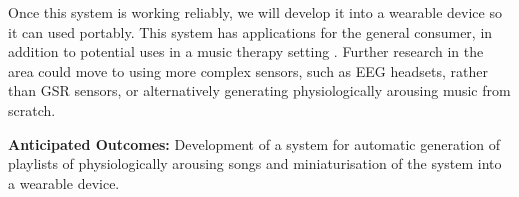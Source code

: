 \documentclass[a4paper,12pt]{article}
\begin{document}
	Once this system is working reliably, we will develop it into a wearable device so it can used portably. This system has applications for the general consumer, in addition to potential uses in a music therapy setting \citep{musicTherapy}. Further research in the area could move to using more complex sensors, such as EEG headsets, rather than GSR sensors, or alternatively generating physiologically arousing music from scratch.
	
	\textbf{Anticipated Outcomes:} Development of a system for automatic generation of playlists of physiologically arousing songs and miniaturisation of the system into a wearable device.
	
	
\end{document}
